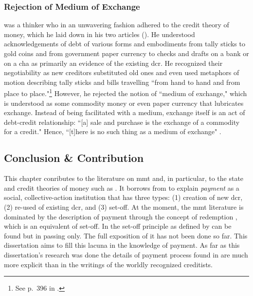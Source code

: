 \subsubsection{Rejection of Medium of Exchange}\label{sec:medium_of_exchange}

\citeauthor{innes1913} was a thinker who in an unwavering fashion adhered to the credit theory of money, which he laid down in his two articles (\citeyear{innes1913,innes1914}). He understood acknowledgements of debt of various forms and embodiments from tally sticks to gold coins and from government paper currency to checks and drafts on a bank or on a \acf{cha} as primarily an evidence of the existing \acf{dcr}. He recognized their negotiability as new creditors substituted old ones and even used metaphors of motion describing tally sticks and bills travelling ``from hand to hand and from place to
place."\footnote{See p.~396 in \cite{innes1913}.} However, he rejected the notion of ``medium of exchange," which is understood as some commodity money or even paper currency that lubricates exchange. Instead of being facilitated with a medium, exchange itself is an act of debt-credit relationship: ``[a] sale and purchase is the exchange of a commodity for a credit." Hence, ``[t]here is no such thing as a medium of exchange" \citep[p.~168]{innes1914}.

\subsection{Conclusion \& Contribution}

This chapter conributes to the literature on \ac{mmt} and, in particular, to the state and credit theories of money such as \citep{wray2004,wray2020,tymoigne2017,tymoigne2024}. It borrows from \citep{innes1909,innes1910,innes1913,innes1914} to explain \textit{payment} as a social, collective-action institution that has three types: (1) creation of new \acf{dcr}, (2) re-used of existing \acf{dcr}, and (3) set-off. At the moment, the \ac{mmt} literature is dominated by the description of payment through the concept of redemption \citep{wray2020,tymoigne2017,tymoigne2024}, which is an equivalent of set-off. In \citep[p.~241]{wray2004_} the set-off principle as defined by \citeauthor{innes1913} can be found but in passing only. The full exposition of it has not been done so far. This dissertation aims to fill this lacuna in the knowledge of payment. As far as this dissertation's research was done the details of payment process found in \citeauthor{innes1913} are much more explicit than in the writings of the worldly recognized creditists. 

